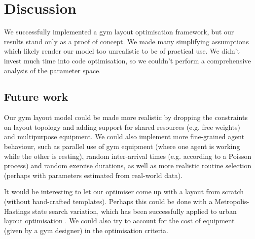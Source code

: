 \documentclass[9pt]{pnas-new}
\begin{document}
\section*{Discussion}

We successfully implemented a gym layout optimisation framework, but our results stand only as a proof of concept.
We made many simplifying assumptions which likely render our model too unrealistic to be of practical use.
We didn't invest much time into code optimisation, so we couldn't perform a comprehensive analysis of the parameter space.
 
\subsection*{Future work} 

Our gym layout model could be made more realistic by dropping the constraints on layout topology and adding support for shared resources (e.g. free weights) and multipurpose equipment.
We could also implement more fine-grained agent behaviour, such as parallel use of gym equipment (where one agent is working while the other is resting), random inter-arrival times (e.g. according to a Poisson process) and random exercise durations,
as well as more realistic routine selection (perhaps with parameters estimated from real-world data).

It would be interesting to let our optimiser come up with a layout from scratch (without hand-crafted templates).
Perhaps this could be done with a Metropolis-Hastings state search variation, which has been successfully applied to urban layout optimisation \cite
{feng2016crowd_drive_layout_design,mathew2019urban_walkability}.
We could also try to account for the cost of equipment (given by a gym designer) in the optimisation criteria.



\showacknow %


\begin{multicols}{2}
\section*{\bibname}

\end{multicols}
\end{document}
